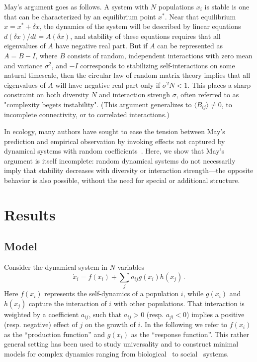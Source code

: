 \documentclass[
 reprint,
 amsmath,amssymb,
 aps,
]{revtex4-2}
\begin{document}
May's argument goes as follows. A system with $N$ populations $x_i$ is stable 
is one that can be characterized by an equilibrium point $x^*$. 
Near that equilibrium $x = x^* + \delta x$, the 
dynamics of the system will be described by linear 
equations $d(\delta x)/dt = A (\delta x)$, and stability of 
these equations requires that all eigenvalues of $A$ 
have negative real part. But if $A$ can be represented as $A = B - I$, 
where $B$ consists of random, independent interactions with zero 
mean and variance $\sigma^2$, and $-I$ corresponds to 
stabilizing self-interactions on some natural timescale, 
then the circular law of random matrix theory implies that all 
eigenvalues of $A$ will have negative real part only if $\sigma^2 N < 1$. 
This places a sharp constraint on both diversity $N$ and interaction 
strengh $\sigma$, often referred to as "complexity begets instability". 
(This argument generalizes to $\langle B_{ij}\rangle \neq 0$, 
to incomplete connectivity, or to correlated interactions.)

In ecology, many authors have sought to ease the tension between May's 
prediction and empirical observation by invoking effects not captured by 
dynamical systems with random 
coefficients~\cite{McCann2000,Chesson2000,Mougi2012,Rohr2014,Barabas2017,Grilli2017}. 
Here, we show that May's argument is itself incomplete: 
random dynamical systems do not necessarily imply that 
stability decreases with diversity or interaction 
strength---the opposite behavior is also possible, 
without the need for special or additional structure. 

\section{Results}

\subsection{Model}

Consider the dynamical system in $N$ variables
\begin{equation}\label{dynamics}
    \dot{x}_i = f(x_i) + \sum_{j}a_{ij}g(x_i)h(x_j) \, .
\end{equation}
Here $f(x_i)$ represents the self-dynamics of a population $i$, while $g(x_i)$ and $h(x_j)$ capture the interaction of $i$ with other populations. 
That interaction is weighted by a coefficient $a_{ij}$, such that $a_{ij} > 0$ (resp. $a_{ji} < 0$) implies a positive (resp. negative) effect of $j$ on the growth of $i$. 
In the following we refer to $f(x_i)$ as the ``production function'' and $g(x_i)$ as the ``response function''. 
This rather general setting has been used to study universality\cite{Barzel2013} and to construct 
minimal models for complex dynamics\cite{Barzel2015} ranging from biological~\cite{Alon2006,Karlebach2008,Skinner2012} 
to social~\cite{Pastor-Satorras2001,Hufnagel2004,Dodds2005} systems. 
\end{document}
